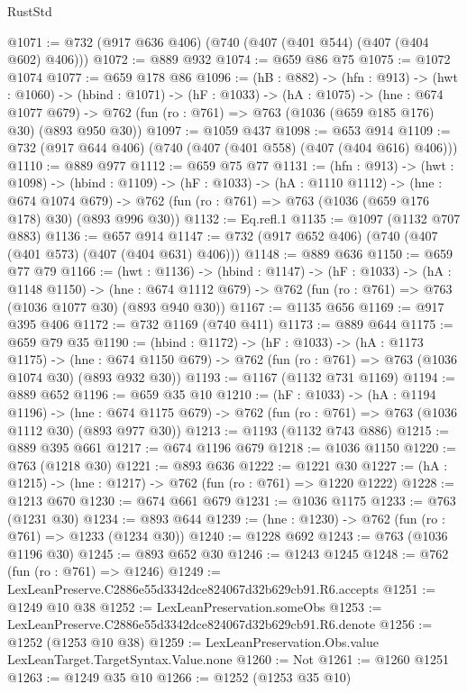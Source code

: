 \begin{lexlean}{RustStd}
\begin{coremodule}
@1071 := @732 (@917 @636 @406) (@740 (@407 (@401 @544) (@407 (@404 @602) @406)))
@1072 := @889 @932
@1074 := @659 @86 @75
@1075 := @1072 @1074
@1077 := @659 @178 @86
@1096 := (hB : @882) ->
  (hfn : @913) ->
  (hwt : @1060) ->
  (hbind : @1071) ->
  (hF : @1033) ->
  (hA : @1075) ->
  (hne : @674 @1077 @679) ->
  @762 (fun (ro : @761) => @763 (@1036 (@659 @185 @176) @30) (@893 @950 @30))
@1097 := @1059 @437
@1098 := @653 @914
@1109 := @732 (@917 @644 @406) (@740 (@407 (@401 @558) (@407 (@404 @616) @406)))
@1110 := @889 @977
@1112 := @659 @75 @77
@1131 := (hfn : @913) ->
  (hwt : @1098) ->
  (hbind : @1109) ->
  (hF : @1033) ->
  (hA : @1110 @1112) ->
  (hne : @674 @1074 @679) ->
  @762 (fun (ro : @761) => @763 (@1036 (@659 @176 @178) @30) (@893 @996 @30))
@1132 := Eq.refl.{1}
@1135 := @1097 (@1132 @707 @883)
@1136 := @657 @914
@1147 := @732 (@917 @652 @406) (@740 (@407 (@401 @573) (@407 (@404 @631) @406)))
@1148 := @889 @636
@1150 := @659 @77 @79
@1166 := (hwt : @1136) ->
  (hbind : @1147) ->
  (hF : @1033) ->
  (hA : @1148 @1150) ->
  (hne : @674 @1112 @679) -> @762 (fun (ro : @761) => @763 (@1036 @1077 @30) (@893 @940 @30))
@1167 := @1135 @656
@1169 := @917 @395 @406
@1172 := @732 @1169 (@740 @411)
@1173 := @889 @644
@1175 := @659 @79 @35
@1190 := (hbind : @1172) ->
  (hF : @1033) ->
  (hA : @1173 @1175) ->
  (hne : @674 @1150 @679) -> @762 (fun (ro : @761) => @763 (@1036 @1074 @30) (@893 @932 @30))
@1193 := @1167 (@1132 @731 @1169)
@1194 := @889 @652
@1196 := @659 @35 @10
@1210 := (hF : @1033) ->
  (hA : @1194 @1196) ->
  (hne : @674 @1175 @679) -> @762 (fun (ro : @761) => @763 (@1036 @1112 @30) (@893 @977 @30))
@1213 := @1193 (@1132 @743 @886)
@1215 := @889 @395 @661
@1217 := @674 @1196 @679
@1218 := @1036 @1150
@1220 := @763 (@1218 @30)
@1221 := @893 @636
@1222 := @1221 @30
@1227 := (hA : @1215) -> (hne : @1217) -> @762 (fun (ro : @761) => @1220 @1222)
@1228 := @1213 @670
@1230 := @674 @661 @679
@1231 := @1036 @1175
@1233 := @763 (@1231 @30)
@1234 := @893 @644
@1239 := (hne : @1230) -> @762 (fun (ro : @761) => @1233 (@1234 @30))
@1240 := @1228 @692
@1243 := @763 (@1036 @1196 @30)
@1245 := @893 @652 @30
@1246 := @1243 @1245
@1248 := @762 (fun (ro : @761) => @1246)
@1249 := LexLeanPreserve.C2886e55d3342dce824067d32b629cb91.R6.accepts
@1251 := @1249 @10 @38
@1252 := LexLeanPreservation.someObs
@1253 := LexLeanPreserve.C2886e55d3342dce824067d32b629cb91.R6.denote
@1256 := @1252 (@1253 @10 @38)
@1259 := LexLeanPreservation.Obs.value LexLeanTarget.TargetSyntax.Value.none
@1260 := Not
@1261 := @1260 @1251
@1263 := @1249 @35 @10
@1266 := @1252 (@1253 @35 @10)

\end{coremodule}
\end{lexlean}

